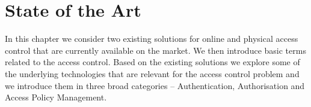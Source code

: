 \section{State of the Art} \label{sec:sota}

In this chapter we consider two existing solutions for online and physical access control that are currently available on the market. We then introduce basic terms related to the access control. Based on the existing solutions we explore some of the underlying technologies that are relevant for the access control problem and we introduce them in three broad categories -- Authentication, Authorisation and Access Policy Management.







